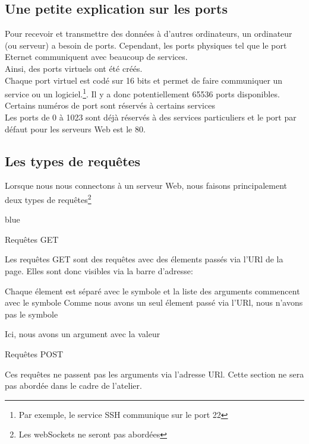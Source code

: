 \subsection{Une petite explication sur les ports}

Pour recevoir et transmettre des données à d’autres ordinateurs, un ordinateur (ou serveur) a
besoin de ports. Cependant, les ports physiques tel que le port Eternet communiquent avec beaucoup de services.\\

Ainsi, des ports virtuels ont été créés. \\


Chaque port virtuel est codé sur 16 bits et permet de faire communiquer un service
ou un logiciel.\footnote{Par exemple, le service SSH communique sur le port 22}. Il y a donc potentiellement
65536 ports disponibles. Certains numéros de port sont réservés à certains services \\
Les ports de 0 à 1023 sont déjà réservés à des services particuliers et le port par défaut pour les serveurs Web est le 80.

\subsection{Les types de requêtes}

Lorsque nous nous connectons à un serveur Web, nous faisons principalement deux types de requêtes\footnote{Les webSockets ne seront pas abordées}
\begin{items}{blue}{\Triangle}
\item Requêtes GET

Les requêtes GET sont des requêtes avec des élements passés via l'URl de la page.
Elles sont donc visibles via la barre d'adresse: 


Chaque élement est séparé avec le symbole  et la liste des arguments commencent avec le symbole  
Comme nous avons un seul élement passé via l'URl, nous n'avons pas le symbole 

Ici, nous avons un argument  avec la valeur 

\item Requêtes POST

Ces requêtes ne passent pas les arguments via l'adresse URl. Cette section ne sera pas abordée dans le cadre de l'atelier.
\end{items}

